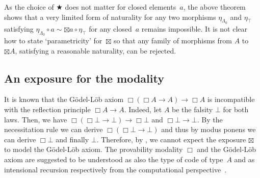 \documentclass[draft,a4paper,UKenglish,numberwithinsect,cleveref,thm-restate]{lipics-v2021}
\numberwithin{equation}{section}
\theoremstyle{definition}
\theoremstyle{plain}
\begin{document}
%
As the choice of $\bigstar$ does not matter for closed elements~$a$, the above theorem shows that a very limited form of naturality for any two morphisms $\eta_{\Lambda_0}$ and $\eta_\top$ satisfying $\eta_{\Lambda_0} \circ a \sim \boxtimes{a} \circ \eta_{\top}$ for any closed~$a$ remains impossible. 
It is not clear how to state `parametricity' for~$\boxtimes$ so that any family of morphisms from $A$ to $\boxtimes A$, satisfying a reasonable naturality, can be rejected. 

\subsection{An exposure for the \texorpdfstring{\GL}{GL} modality}
It is known that the Gödel-Löb axiom $\Box(\Box A \to A) \to \Box A$ is incompatible with the reflection principle $\Box A \to A$.
Indeed, let $A$ be the falsity $\bot$ for both laws. Then, we have $\Box(\Box \bot \to \bot) \to \Box \bot$ and $\Box \bot \to \bot$.
By the necessitation rule we can derive $\Box (\Box \bot \to \bot)$ and thus by modus ponens we can derive $\Box \bot$ and finally $\bot$.
Therefore, by , we cannot expect the exposure $\boxtimes$ to model the Gödel-Löb axiom.
The provability modality $\Box$ and the Gödel-Löb axiom are suggested to be understood as also the type of code of type~$A$ and as intensional recursion respectively from the computational perspective~\cite{Kavvos2017b}.
\end{document}
